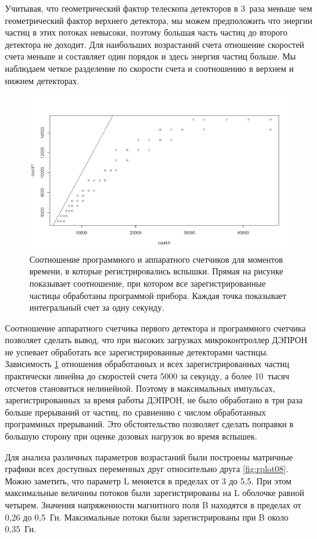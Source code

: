 Учитывая, что геометрический фактор телескопа детекторов в 3~раза меньше чем геометрический фактор верхнего детектора, мы можем предположить что энергии частиц в этих потоках невысоки, поэтому большая часть частиц до второго детектора не доходит.	Для наибольших возрастаний счета отношение скоростей счета меньше и составляет один порядок и здесь энергия частиц больше. Мы наблюдаем четкое разделение по скорости счета и соотношению в верхнем и нижнем детекторах. 
\begin{figure}[h]
	\centering
	\includegraphics[width=0.7\linewidth]{images/Flash/Rplot04}
	\caption{Соотношение программного и аппаратного счетчиков для моментов времени, в которые регистрировались вспышки. Прямая на рисунке показывает соотношение, при котором все зарегистрированные частицы обработаны программой прибора. Каждая точка показывает интегральный счет за одну секунду.}
	\label{fig:rplot04}
\end{figure}
Соотношение аппаратного счетчика первого детектора и программного счетчика позволяет сделать вывод, что при высоких загрузках микроконтроллер ДЭПРОН не успевает обработать все зарегистрированные детекторами частицы. Зависимость \ref{fig:rplot04} отношения обработанных и всех зарегистрированных частиц практически линейна до скоростей счета 5000 за секунду, а более 10~тысяч отсчетов становиться нелинейной. Поэтому в максимальных импульсах, зарегистрированных за время работы ДЭПРОН, не было обработано в три раза больше прерываний от частиц, по сравнению с числом обработанных программных прерываний. Это обстоятельство позволяет сделать поправки в большую сторону при оценке дозовых нагрузок во время вспышек. 

Для анализа различных параметров возрастаний были построены матричные графики всех доступных переменных друг относительно друга 	\ref{fig:rplot08}. Можно заметить, что параметр L меняется в пределах от 3 до 5,5. При этом максимальные величины потоков были зарегистрированы на L оболочке равной четырем. Значения напряженности магнитного поля B находятся в пределах от 0,26 до 0,5~Гн. Максимальные потоки были зарегистрированы при B около 0,35~Гн. 


